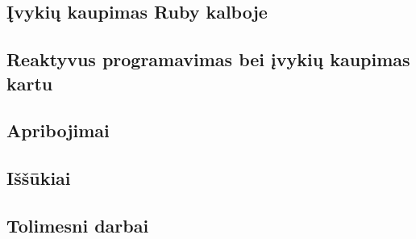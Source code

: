 \subsection{Įvykių kaupimas Ruby kalboje}

\subsection{Reaktyvus programavimas bei įvykių kaupimas kartu}

\subsection{Apribojimai}

\subsection{Iššūkiai}

\subsection{Tolimesni darbai}
